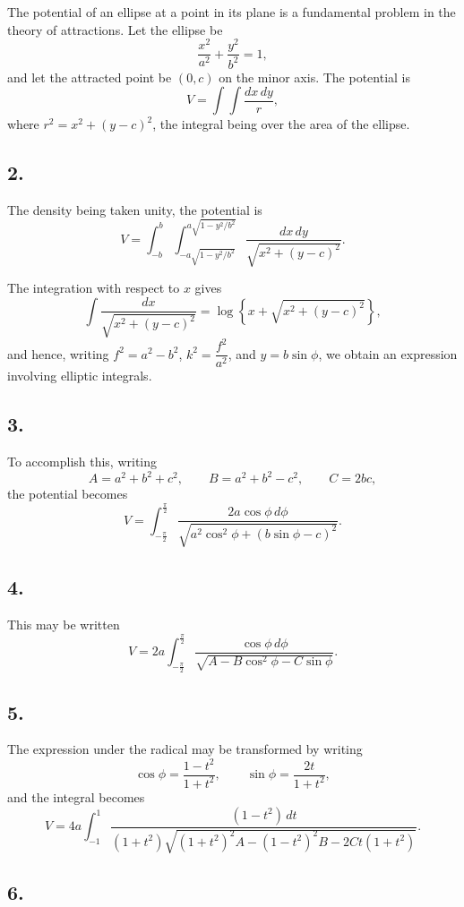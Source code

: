\documentclass[11pt,a4paper]{article}
\begin{document}
The potential of an ellipse at a point in its plane is a fundamental problem
in the theory of attractions. Let the ellipse be
\[
\frac{x^2}{a^2} + \frac{y^2}{b^2} = 1,
\]
and let the attracted point be $(0,c)$ on the minor axis. The potential is
\[
V = \int\!\!\!\int \frac{dx\,dy}{r},
\]
where $r^2=x^2+(y-c)^2$, the integral being over the area of the ellipse.

\subsection*{2.}

The density being taken unity, the potential is
\[
V = \int_{-b}^{b} \int_{-a\sqrt{1-y^2/b^2}}^{a\sqrt{1-y^2/b^2}}
    \frac{dx\,dy}{\sqrt{x^2+(y-c)^2}}.
\]

The integration with respect to $x$ gives
\[
\int \frac{dx}{\sqrt{x^2+(y-c)^2}}
  = \log\left\{x+\sqrt{x^2+(y-c)^2}\right\},
\]
and hence, writing $f^2=a^2-b^2$, $k^2=\dfrac{f^2}{a^2}$, and
$y=b\sin\phi$, we obtain an expression involving elliptic integrals.

\newpage
\subsection*{3.}

To accomplish this, writing
\[
A = a^2+b^2+c^2, \qquad
B = a^2+b^2-c^2, \qquad
C = 2bc,
\]
the potential becomes
\[
V = \int_{-\frac{\pi}{2}}^{\frac{\pi}{2}}
    \frac{2a\cos\phi\,d\phi}
         {\sqrt{a^2\cos^2\phi+(b\sin\phi-c)^2}}.
\]

\subsection*{4.}

This may be written
\[
V = 2a \int_{-\frac{\pi}{2}}^{\frac{\pi}{2}}
    \frac{\cos\phi\,d\phi}
         {\sqrt{A-B\cos^2\phi-C\sin\phi}}.
\]

\subsection*{5.}

The expression under the radical may be transformed by writing
\[
\cos\phi = \frac{1-t^2}{1+t^2}, \qquad
\sin\phi = \frac{2t}{1+t^2},
\]
and the integral becomes
\[
V = 4a \int_{-1}^{1}
    \frac{(1-t^2)\,dt}
         {(1+t^2)\sqrt{(1+t^2)^2A-(1-t^2)^2B-2Ct(1+t^2)}}.
\]

\subsection*{6.}
\end{document}

